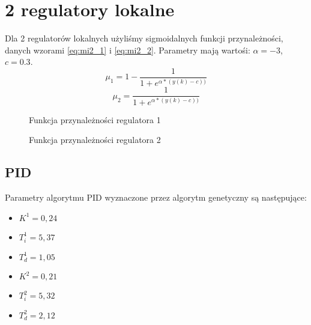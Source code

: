 \section{2 regulatory lokalne}
Dla 2 regulatorów lokalnych użyliśmy sigmoidalnych funkcji przynależności, danych wzorami \ref{eq:mi2_1} i \ref{eq:mi2_2}. Parametry mają wartośi: $\alpha = -3$, $c = 0.3$.
\begin{equation} \label{eq:mi2_1}
\mu_1 = 1 - \frac{1}{1+e^{\alpha * (y(k)-c))}}
\end{equation}
\begin{equation} \label{eq:mi2_2}
\mu_2 = \frac{1}{1+e^{\alpha * (y(k)-c))}}
\end{equation}

\begin{figure}[H]
\centering
{}
\caption{Funkcja przynależności regulatora 1}
\label{fig:mi2_1}
\end{figure}

\begin{figure}[H]
\centering
{}
\caption{Funkcja przynależności regulatora 2}
\label{fig:mi2_2}
\end{figure}

\subsection{PID}
Parametry algorytmu PID wyznaczone przez algorytm genetyczny są następujące:
\begin{itemize}
\item $K^1 = 0,24$
\item $T^1_i = 5,37$
\item $T^1_d = 1,05$
\\
\item $K^2 = 0,21$
\item $T^2_i = 5,32$
\item $T^2_d = 2,12$
\end{itemize}

